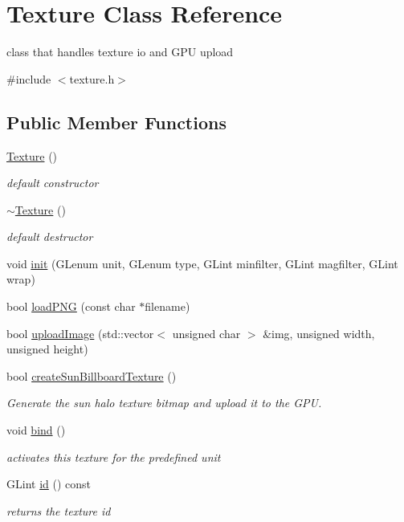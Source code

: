 \hypertarget{classTexture}{}\section{Texture Class Reference}
\label{classTexture}


class that handles texture io and G\+PU upload  




{\ttfamily \#include $<$texture.\+h$>$}

\subsection*{Public Member Functions}
\begin{DoxyCompactItemize}
\item 
\hyperlink{classTexture_a6c275e3f186675ff6ed73ccf970e552f}{Texture} ()
\begin{DoxyCompactList}\small\item\em default constructor \end{DoxyCompactList}\item 
\hyperlink{classTexture_a09c4bcb7462f64c1d20fa69dba3cee8a}{$\sim$\+Texture} ()
\begin{DoxyCompactList}\small\item\em default destructor \end{DoxyCompactList}\item 
void \hyperlink{classTexture_a9a8cf50e16cf499931d94ad37e3cd074}{init} (G\+Lenum unit, G\+Lenum type, G\+Lint minfilter, G\+Lint magfilter, G\+Lint wrap)
\item 
bool \hyperlink{classTexture_afd7b219173389b10fb4d41c68f0e26d8}{load\+P\+NG} (const char $\ast$filename)
\item 
bool \hyperlink{classTexture_a49a30cbb4fb0be42832c6b9bd0a2e786}{upload\+Image} (std\+::vector$<$ unsigned char $>$ \&img, unsigned width, unsigned height)
\item 
bool \hyperlink{classTexture_a124fe8f7960fad810b68e3d4f5870cbe}{create\+Sun\+Billboard\+Texture} ()
\begin{DoxyCompactList}\small\item\em Generate the sun halo texture bitmap and upload it to the G\+PU. \end{DoxyCompactList}\item 
void \hyperlink{classTexture_a3840dc7429982ffaddeafc8d62345b5d}{bind} ()
\begin{DoxyCompactList}\small\item\em activates this texture for the predefined unit \end{DoxyCompactList}\item 
G\+Lint \hyperlink{classTexture_af6d8cc702b5f11b8c0dabb0ddaa3cdcf}{id} () const 
\begin{DoxyCompactList}\small\item\em returns the texture id \end{DoxyCompactList}\end{DoxyCompactItemize}
